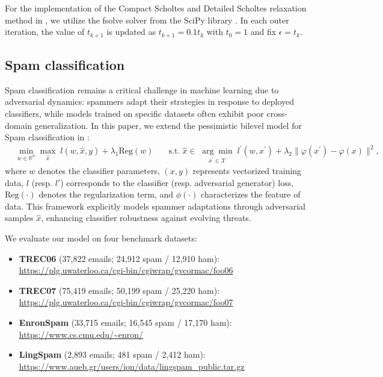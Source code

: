 \documentclass{article}
\def\x{x}
\def\y{y}
\def\IR{\mathbb{R}}
\begin{document}
    For the implementation of the Compact Scholtes and Detailed Scholtes relaxation method in \cite{benchouk2025scholtes}, we utilize the fsolve solver from the SciPy library \cite{virtanen2020scipy}. In each outer iteration, the value of \( t_{k+1} \) is updated as \( t_{k+1} = 0.1 t_k \) with \( t_0 = 1 \) and fix $\epsilon=t_k$. 

    \subsection{Spam classification}\label{spam detail}
    Spam classification remains a critical challenge in machine learning due to adversarial dynamics: 
    spammers adapt their strategies in response to deployed classifiers, while models trained on specific datasets often exhibit poor cross-domain generalization. In this paper, we extend the pessimistic bilevel model for Spam classification in \cite{bruckner2011stackelberg}:
	\begin{align}
    &\min_{w\in\IR^n}\max_{\hat{\x}}\;l(w,\hat{\x},\y)+\lambda_1\text{Reg}(w)\quad &\text{s.t.}\;\hat{\x}\in\;\underset{\x^\prime\in\mathcal{X}}{\arg\min}\; l^\prime(w,\x^\prime)+\lambda_2\|\varphi(\x^\prime)-\varphi(\x)\|^2,
	\end{align}
    where $w$ denotes the classifier parameters, $(\x,\y)$ represents vectorized training data, $l$ (resp. $l'$) corresponds to the classifier (resp. adversarial generator) loss, $\text{Reg}(\cdot)$ denotes the regularization term, and $\phi(\cdot)$ characterizes the feature of data. This framework explicitly models spammer adaptations through adversarial samples $\hat{\x}$, enhancing classifier robustness against evolving threats.

    We evaluate our model on four benchmark datasets:
    \begin{itemize}
        \item \textbf{TREC06} (37,822 emails; 24,912 spam / 12,910 ham): \url{https://plg.uwaterloo.ca/cgi-bin/cgiwrap/gvcormac/foo06}
        \item \textbf{TREC07} (75,419 emails; 50,199 spam / 25,220 ham): \url{https://plg.uwaterloo.ca/cgi-bin/cgiwrap/gvcormac/foo07}
        \item \textbf{EnronSpam} (33,715 emails; 16,545 spam / 17,170 ham): \url{https://www.cs.cmu.edu/~enron/}
        \item \textbf{LingSpam} (2,893 emails; 481 spam / 2,412 ham): \url{https://www.aueb.gr/users/ion/data/lingspam_public.tar.gz}
    \end{itemize}
        
\end{document}
